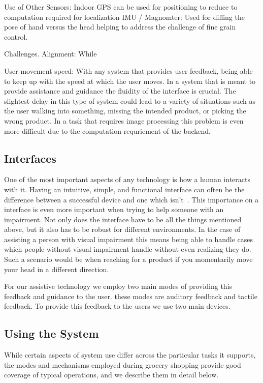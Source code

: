Use of Other Sensors:
    Indoor GPS
        can be used for positioning to reduce to computation required for localization
    IMU / Magnomter:
        Used for diffing the pose of hand versus the head helping to address the challenge of fine grain control.

Challenges.
    Alignment:
        While 

    User movement speed:
        With any system that provides user feedback, being able to keep up with the speed at which the user moves. In a system that is meant to provide assistance and guidance the fluidity of the interface is crucial. The slightest delay in this type of system could lead to a variety of situations such as the user walking into something, missing the intended product, or picking the wrong product. In a task that requires image processing this problem is even more difficult due to the computation requriement of the backend.

\subsection{Interfaces}
One of the most important aspects of any technology is how a human interacts with it. Having an intuitive, simple, and functional interface can often be the difference between a successful device and one which isn't~\cite{iPhone}. This importance on a interface is even more important when trying to help someone with an impairment. Not only does the interface have to be all the things mentioned above, but it also has to be robust for different environments. In the case of assisting a person with visual impairment this means being able to handle cases which people without visual impairment handle without even realizing they do. Such a scenario would be when reaching for a product if you momentarily move your head in a different direction.

For our assistive technology we employ two main modes of providing this feedback and guidance to the user. these modes are auditory feedback and tactile feedback. To provide this feedback to the users we use two main devices.

\subsection{Using the System}
While certain aspects of system use differ across the particular tasks it supports, the modes and mechanisms employed during grocery shopping provide good coverage of typical operations, and we describe them in detail below.

